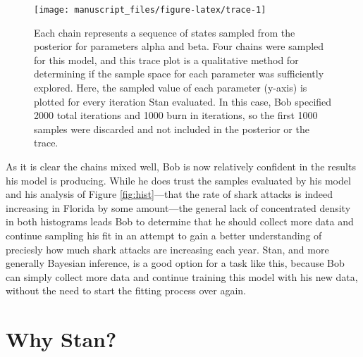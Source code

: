 \documentclass[
  12pt,
]{book}
\theoremstyle{definition}
\theoremstyle{definition}
\theoremstyle{definition}
\theoremstyle{remark}
\begin{document}
\begin{figure}

{\centering \texttt{[image: manuscript\_files/figure-latex/trace-1]} 

}

\caption{Each chain represents a sequence of states sampled from the posterior for parameters alpha and beta. Four chains were sampled for this model, and this trace plot is a qualitative method for determining if the sample space for each parameter was sufficiently explored. Here, the sampled value of each parameter (y-axis) is plotted for every iteration Stan evaluated. In this case, Bob specified 2000 total iterations and 1000 burn in iterations, so the first 1000 samples were discarded and not included in the posterior or the trace.}\label{fig:trace}
\end{figure}

As it is clear the chains mixed well, Bob is now relatively confident in the results his model is producing. While he does trust the samples evaluated by his model and his analysis of Figure \ref{fig:hist}---that the rate of shark attacks is indeed increasing in Florida by some amount---the general lack of concentrated density in both histograms leads Bob to determine that he should collect more data and continue sampling his fit in an attempt to gain a better understanding of preciesly how much shark attacks are increasing each year.
Stan, and more generally Bayesian inference, is a good option for a task like this, because Bob can simply collect more data and continue training this model with his new data, without the need to start the fitting process over again.

\hypertarget{why-stan}{%
\section{Why Stan?}\label{why-stan}}
\end{document}
